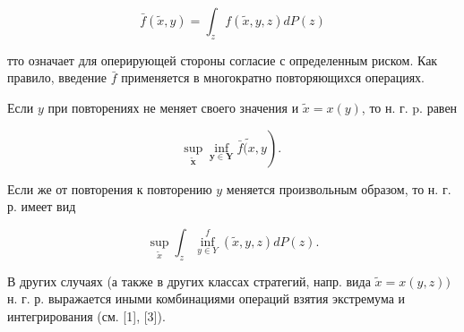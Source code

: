 \documentclass[10pt]{article}
\begin{document}
\[

\bar{f}(\tilde{x}, y)=\int_{z} f(\tilde{x}, y, z) d P(z)

\]



тто означает для оперирующей стороны согласие с определенным риском. Как правило, введение $\bar{f}$ применяется в многократно повторяющихся операциях.



Если $y$ при повторениях не меняет своего значения и $\tilde{x}=x(y)$, то н. г. p. равен



\[

\left.\sup _{\tilde{\boldsymbol{x}}} \inf _{\boldsymbol{y} \in \boldsymbol{Y}} \bar{f} \tilde{(x}, y\right) \text {. }

\]



Если же от повторения к повторению $y$ меняется произвольным образом, то н. г. р. имеет вид



\[

\sup _{\tilde{x}} \int_{z} \inf _{y \in Y}^{f}(\tilde{x}, y, z) d P(z) .

\]



В других случаях (а также в других классах стратегий, напр. вида $\tilde{x}=x(y, z))$ н. г. р. выражается иными комбинациями операций взятия экстремума и интегрирования (см. [1], [3]).
\end{document}
